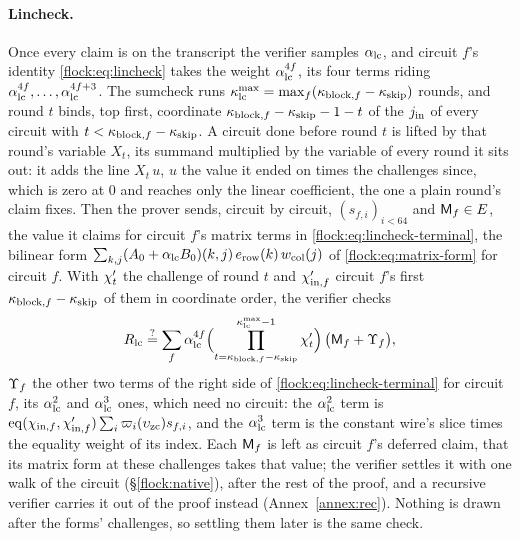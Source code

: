\paragraph{Lincheck.} Once every claim is on the transcript the verifier samples $\alpha_{\mathrm{lc}}$, and circuit $f$'s identity \eqref{flock:eq:lincheck} takes the weight $\alpha_{\mathrm{lc}}^{4f}$, its four terms riding $\alpha_{\mathrm{lc}}^{4f},\dots,\alpha_{\mathrm{lc}}^{4f+3}$. The sumcheck runs $\kappa_{\mathrm{lc}}^{\max}=\max_f(\kappa_{\mathrm{block},f}-\kappa_{\mathrm{skip}})$ rounds, and round $t$ binds, top first, coordinate $\kappa_{\mathrm{block},f}-\kappa_{\mathrm{skip}}-1-t$ of the $j_{\mathrm{in}}$ of every circuit with $t<\kappa_{\mathrm{block},f}-\kappa_{\mathrm{skip}}$. A circuit done before round $t$ is lifted by that round's variable $X_t$, its summand multiplied by the variable of every round it sits out: it adds the line $X_t\,u$, $u$ the value it ended on times the challenges since, which is zero at $0$ and reaches only the linear coefficient, the one a plain round's claim fixes. Then the prover sends, circuit by circuit, $(s_{f,i})_{i<64}$ and $\mathsf{M}_{f}\in E$, the value it claims for circuit $f$'s matrix terms in \eqref{flock:eq:lincheck-terminal}, the bilinear form $\sum_{k,j}(A_{0}+\alpha_{\mathrm{lc}} B_{0})(k,j)\,e_{\mathrm{row}}(k)\,w_{\mathrm{col}}(j)$ of \eqref{flock:eq:matrix-form} for circuit $f$. With $\chi'_t$ the challenge of round $t$ and $\chi'_{\mathrm{in},f}$ circuit $f$'s first $\kappa_{\mathrm{block},f}-\kappa_{\mathrm{skip}}$ of them in coordinate order, the verifier checks
\begin{equation}\label{flock:eq:batch-lc-terminal}
R_{\mathrm{lc}}\stackrel{?}{=}\sum_f\alpha_{\mathrm{lc}}^{4f}\Bigl(\prod_{t=\kappa_{\mathrm{block},f}-\kappa_{\mathrm{skip}}}^{\kappa_{\mathrm{lc}}^{\max}-1}\chi'_t\Bigr)\,\bigl(\mathsf{M}_{f}+\Upsilon_{f}\bigr),
\end{equation}
$\Upsilon_{f}$ the other two terms of the right side of \eqref{flock:eq:lincheck-terminal} for circuit $f$, its $\alpha_{\mathrm{lc}}^2$ and $\alpha_{\mathrm{lc}}^3$ ones, which need no circuit: the $\alpha_{\mathrm{lc}}^2$ term is $\operatorname{eq}(\chi_{\mathrm{in},f},\chi'_{\mathrm{in},f})\sum_i\varpi_i(\upsilon_{\mathrm{zc}})s_{f,i}$, and the $\alpha_{\mathrm{lc}}^3$ term is the constant wire's slice times the equality weight of its index. Each $\mathsf{M}_{f}$ is left as circuit $f$'s deferred claim, that its matrix form at these challenges takes that value; the verifier settles it with one walk of the circuit (\S\ref{flock:native}), after the rest of the proof, and a recursive verifier carries it out of the proof instead (Annex~\ref{annex:rec}). Nothing is drawn after the forms' challenges, so settling them later is the same check.

